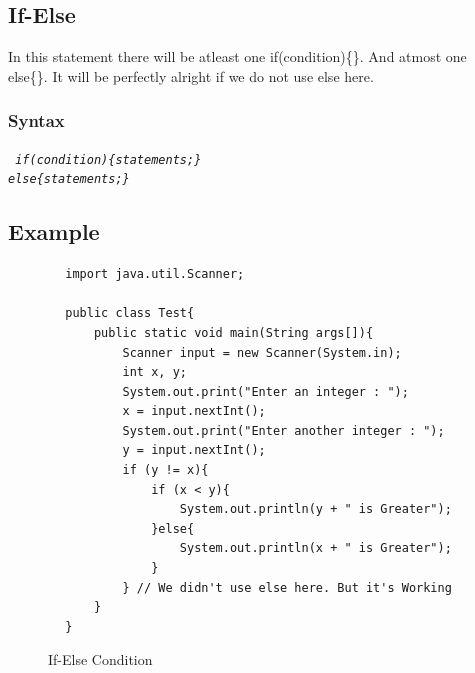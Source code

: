 \documentclass[openany]{book}  %
\begin{document}
\subsection{If-Else}
In this statement there will be atleast one if(condition)\{\}. And atmost one \\
else\{\}. It will be perfectly alright if we do not use else here.
% 
% 
\subsubsection{Syntax}
\begin{center}
    \tt{
        \textit{if(condition)\{statements;\}\\else\{statements;\}}
    }
\end{center}

\newpage

% 
% 
\subsection{Example}
\begin{center}
    \begin{verbatim}
        import java.util.Scanner;

        public class Test{
            public static void main(String args[]){
                Scanner input = new Scanner(System.in);
                int x, y;
                System.out.print("Enter an integer : ");
                x = input.nextInt();
                System.out.print("Enter another integer : ");
                y = input.nextInt();
                if (y != x){
                    if (x < y){
                        System.out.println(y + " is Greater");
                    }else{
                        System.out.println(x + " is Greater");
                    }
                } // We didn't use else here. But it's Working
            }
        }
    \end{verbatim}
\end{center}
% 
% 
\begin{figure}[htbp]
    \begin{center}
        \caption{If-Else Condition}
    \end{center}
\end{figure}
% 
% 
\end{document}
